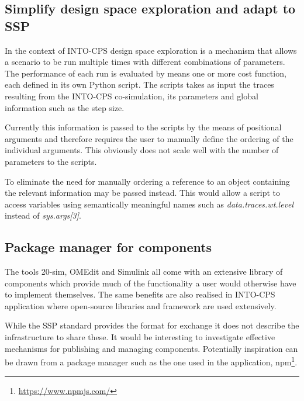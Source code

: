 \subsection{Simplify design space exploration and adapt to SSP} \label{ssec:dse_simplification}
In the context of INTO-CPS design space exploration is a mechanism that allows a scenario to be run multiple times with different combinations of parameters.
The performance of each run is evaluated by means one or more cost function, each defined in its own Python script. 
The scripts takes as input the traces resulting from the INTO-CPS co-simulation, its parameters and global information such as the step size.

Currently this information is passed to the scripts by the means of positional arguments and therefore requires the user to manually define the ordering of the individual arguments. This obviously does not scale well with the number of parameters to the scripts.

To eliminate the need for manually ordering a reference to an object containing the relevant information may be passed instead.
This would allow a script to access variables using semantically meaningful names such as \emph{data.traces.wt.level} instead of \emph{sys.args[3]}.


\subsection{Package manager for components}
The tools 20-sim, OMEdit and Simulink all come with an extensive library of components which provide much of the functionality a user would otherwise have to implement themselves.
The same benefits are also realised in INTO-CPS application where open-source libraries and framework are used extensively.

While the SSP standard provides the format for exchange it does not describe the infrastructure to share these.
It would be interesting to investigate effective mechanisms for publishing and managing components.
Potentially inspiration can be drawn from a package manager such as the one used in the application, npm\footnote{\url{https://www.npmjs.com/}}.







